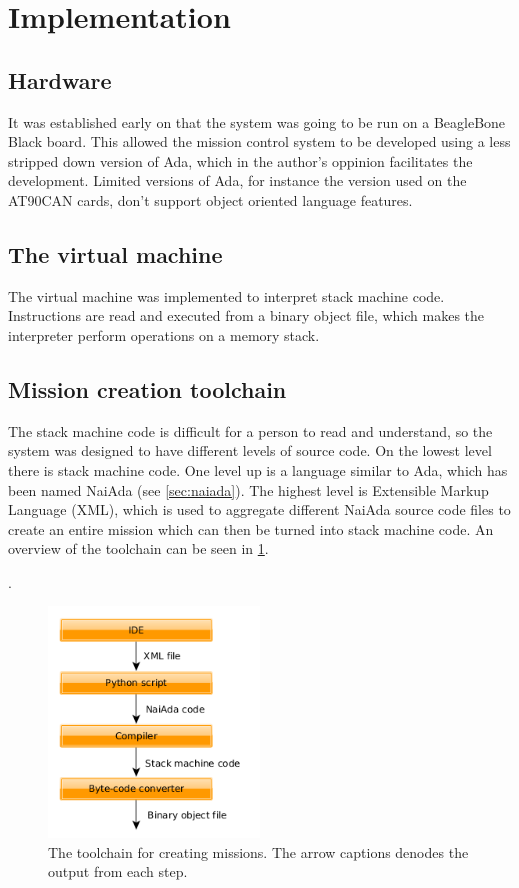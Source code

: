 \section{Implementation}\label{sec:implementation}

\subsection{Hardware}
It was established early on that the system was going to be run on a BeagleBone Black\cite{web:mcsbbb} board. This allowed the mission control system to be developed using a less stripped down version of Ada, which in the author's oppinion facilitates the development. Limited versions of Ada, for instance the version used on the AT90CAN\cite{web:mcsatcan} cards, don't support object oriented language features.

\subsection{The virtual machine}
The virtual machine was implemented to interpret stack machine code. Instructions are read and executed from a binary object file, which makes the interpreter perform operations on
a memory stack.

\subsection{Mission creation toolchain}
The stack machine code is difficult for a person to read and understand, so the system was designed to have different levels of source code. On the lowest level there is
stack machine code. One level up is a language similar to Ada, which has been named NaiAda (see \cref{sec:naiada}). The highest level is Extensible Markup Language (XML), which is used to aggregate different NaiAda source code files
to create an entire mission which can then be turned into stack machine code. An overview of the toolchain can be seen in \cref{fig:another_column_figure}.

\pageref{fig:another_column_figure}.
\begin{figure}[h]
    \includegraphics[width=0.5\textwidth]{./figure/figureMissionCreationToolchain.png}
    \caption{The toolchain for creating missions. The arrow captions denodes the output from each step.}
    \label{fig:another_column_figure}
\end{figure}


